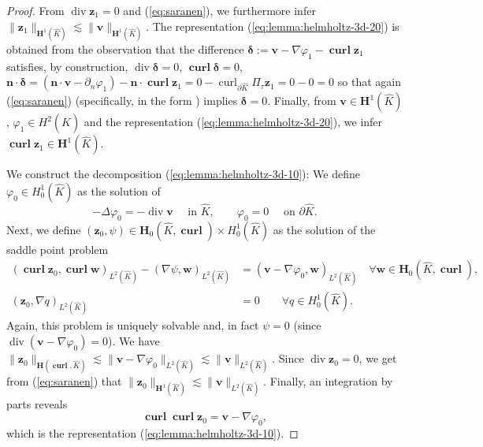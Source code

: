 \documentclass{article}
\begin{document}
\begin{proof}
{}From $\operatorname{div} {\mathbf z}_1 = 0$ and (\ref{eq:saranen}), we furthermore infer 
$\|{\mathbf z}_1\|_{{\mathbf H}^1(\widehat K)} \lesssim \|{\mathbf v}\|_{{\mathbf H}^1(\widehat K)}$. 
The representation (\ref{eq:lemma:helmholtz-3d-20}) is obtained from the observation that the difference 
${\boldsymbol\delta}:= {\mathbf v} - \nabla \varphi_1  - \operatorname{\mathbf{curl}} {\mathbf z}_1$ satisfies, 
by construction, $\operatorname{div} {\boldsymbol \delta} = 0$, $\operatorname{\mathbf{curl}}{\boldsymbol\delta} = 0$, 
${\mathbf n} \cdot {\boldsymbol\delta} = 
({\mathbf n} \cdot {\mathbf v} - \partial_n\varphi_1) - {\mathbf n} \cdot \operatorname{\mathbf{curl}}{\mathbf z}_1 = 
0 - \operatorname{curl}_{\partial\widehat K} \Pi_\tau {\mathbf z}_1  = 0 - 0 = 0$ so that again
(\ref{eq:saranen}) (specifically, in the form \cite[Cor.~{3.51}]{Monkbook}) implies ${\boldsymbol \delta} = 0$. 
Finally, from ${\mathbf v} \in {\mathbf H}^1(\widehat K)$, $\varphi_1 \in H^2(\widehat K)$ and the representation
(\ref{eq:lemma:helmholtz-3d-20}), we infer $\operatorname{\mathbf{curl}} {\mathbf z}_1 \in {\mathbf H}^1(\widehat K)$.


We construct the decomposition (\ref{eq:lemma:helmholtz-3d-10}): 
We define $\varphi_0 \in H^1_0(\widehat K)$ as the solution of 
$$
-\Delta \varphi_0 = -\operatorname{div} {\mathbf v} \quad \mbox{ in $\widehat K$}, 
\qquad \varphi_0 = 0 \quad \mbox{ on $\partial \widehat K$.}
$$
Next, we define $({\mathbf z}_0,\psi) \in {\mathbf H}_0(\widehat K,\operatorname{\mathbf{curl}}) \times H^1_0(\widehat K)$ as the solution 
of the saddle point problem 
\begin{align*}
(\operatorname{\mathbf{curl}} {\mathbf z}_0,
\operatorname{\mathbf{curl}} {\mathbf w})_{L^2(\widehat K)} - (\nabla \psi,{\mathbf w})_{L^2(\widehat K)} & = 
({\mathbf v} - \nabla \varphi_0,{\mathbf w})_{L^2(\widehat K)} \quad \forall {\mathbf w} \in {\mathbf H}_0(\widehat K,\operatorname{\mathbf{curl}}),
\\
( {\mathbf z}_0,\nabla q)_{L^2(\widehat K)} &=0 \qquad \forall q \in H^1_0(\widehat K). 
\end{align*}
Again, this problem is uniquely solvable and, in fact $\psi = 0$ 
(since $\operatorname{div} ({\mathbf v} - \nabla \varphi_0) = 0$).
We have 
$\|{\mathbf z}_0\|_{{\mathbf H}(\operatorname{\mathbf{curl}},\widehat K)} 
\lesssim \|{\mathbf v} - \nabla \varphi_0\|_{L^2(\widehat K)} \lesssim \|{\mathbf v}\|_{L^2(\widehat K)}$. 
Since $\operatorname{div} {\mathbf z}_0 = 0$, we get from (\ref{eq:saranen}) that 
$\|{\mathbf z}_0\|_{{\mathbf H}^1(\widehat K)} \lesssim \|{\mathbf v}\|_{L^2(\widehat K)}$. Finally, 
an integration by parts reveals 
$$
\operatorname{\mathbf{curl}} 
\operatorname{\mathbf{curl}} {\mathbf z_0} = {\mathbf v} - \nabla \varphi_0, 
$$
which is the representation (\ref{eq:lemma:helmholtz-3d-10}). 
\end{proof}
\end{document}
